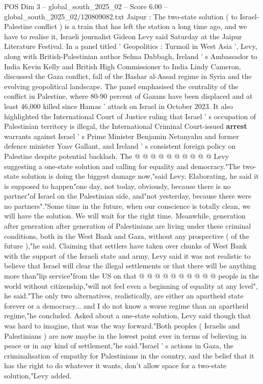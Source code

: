 \begin{textsample}{POS Dim 3 – global\_south\_2025\_02 – Score 6.00 – global\_south\_2025\_02/120809082.txt}  \label{ex:f3_pos_414}
Jaipur : The two-state solution ( to Israel-Palestine conflict ) is a train that has left the station a long time ago, and we have to realise it, Israeli journalist Gideon Levy said Saturday at the Jaipur Literature Festival.
In a panel titled ' Geopolitics : Turmoil in West Asia ', Levy, along with British-Palestinian author Selma Dabbagh, Ireland ' s Ambassador to India Kevin Kelly and British High Commissioner to India Lindy Cameron, discussed the Gaza conflict, fall of the Bashar al-Assad regime in Syria and the evolving geopolitical landscape.
The panel emphasised the centrality of the conflict in Palestine, where 80-90 percent of Gazans have been displaced and at least 46,000 killed since Hamas ' attack on Israel in October 2023.
It also highlighted the International Court of Justice ruling that Israel ' s occupation of Palestinian territory is illegal, the International Criminal Court-issued \textbf{arrest} warrants against Israel ' s Prime Minister Benjamin Netanyahu and former defence minister Yoav Gallant, and Ireland ' s consistent foreign policy on Palestine despite potential backlash.
The @ @ @ @ @ @ @ @ @ @ Levy suggesting a one-state solution and calling for equality and democracy."The two-state solution is doing the biggest damage now,"said Levy.
Elaborating, he said it is supposed to happen"one day, not today, obviously, because there is no partner"of Israel on the Palestinian side, and"not yesterday, because there were no partners"."Some time in the future, when our conscience is totally clean, we will have the solution.
We will wait for the right time.
Meanwhile, generation after generation after generation of Palestinians are living under these criminal conditions, both in the West Bank and Gaza, without any prospective ( of the future ),"he said.
Claiming that settlers have taken over chunks of West Bank with the support of the Israeli state and army, Levy said it was not realistic to believe that Israel will clear the illegal settlements or that there will be anything more than"lip service"from the US on that @ @ @ @ @ @ @ @ @ @ people in the world without citizenship,"will not feel even a beginning of equality at any level", he said."The only two alternatives, realistically, are either an apartheid state forever or a democracy... and I do not know a worse regime than an apartheid regime,"he concluded.
Asked about a one-state solution, Levy said though that was hard to imagine, that was the way forward."Both peoples ( Israelis and Palestinians ) are now maybe in the lowest point ever in terms of believing in peace or in any kind of settlement,"he said."Israel ' s actions in Gaza, the criminalisation of empathy for Palestinians in the country, and the belief that it has the right to do whatever it wants, don't allow space for a two-state solution,"Levy added.

\end{textsample}
